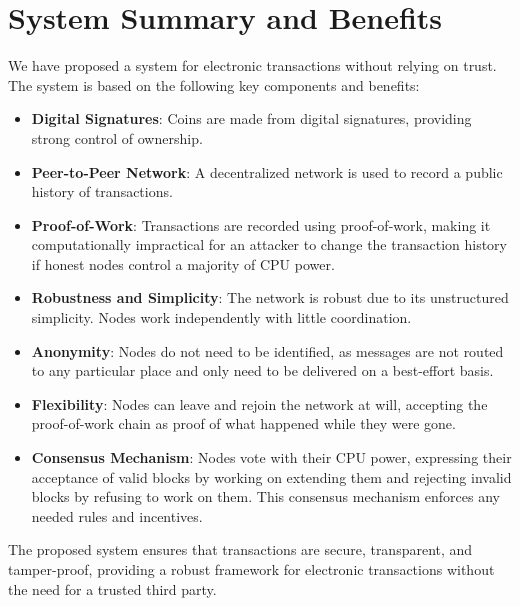 \section{System Summary and Benefits}

We have proposed a system for electronic transactions without relying on trust. The system is based on the following key components and benefits:

\begin{itemize}
    \item \textbf{Digital Signatures}: Coins are made from digital signatures, providing strong control of ownership.
    \item \textbf{Peer-to-Peer Network}: A decentralized network is used to record a public history of transactions.
    \item \textbf{Proof-of-Work}: Transactions are recorded using proof-of-work, making it computationally impractical for an attacker to change the transaction history if honest nodes control a majority of CPU power.
    \item \textbf{Robustness and Simplicity}: The network is robust due to its unstructured simplicity. Nodes work independently with little coordination.
    \item \textbf{Anonymity}: Nodes do not need to be identified, as messages are not routed to any particular place and only need to be delivered on a best-effort basis.
    \item \textbf{Flexibility}: Nodes can leave and rejoin the network at will, accepting the proof-of-work chain as proof of what happened while they were gone.
    \item \textbf{Consensus Mechanism}: Nodes vote with their CPU power, expressing their acceptance of valid blocks by working on extending them and rejecting invalid blocks by refusing to work on them. This consensus mechanism enforces any needed rules and incentives.
\end{itemize}

The proposed system ensures that transactions are secure, transparent, and tamper-proof, providing a robust framework for electronic transactions without the need for a trusted third party.
